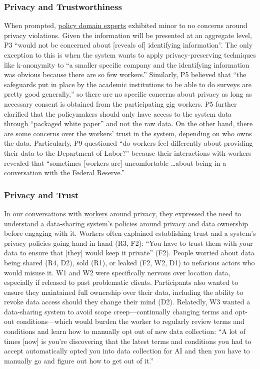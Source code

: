 \subsubsection{Privacy and Trustworthiness}\label{h.63yxjp6nz5ae}
{When prompted, \uline{policy domain experts} exhibited minor to no concerns around privacy violations.}
Given the information will be presented at an aggregate level, P3 ``would not be concerned about [reveals of] identifying information''. The only exception to this is when the system wants to apply privacy-preserving techniques like k-anonymity to ``a smaller specific company and the identifying information was obvious because there are so few workers.'' Similarly, P5 believed that ``the safeguards put in place by the academic institutions to be able to do surveys are pretty good generally,'' so there are no specific concerns about privacy as long as necessary consent {is obtained} from the participating gig workers. P5 further clarified that the policymakers should only have access to the system data through ``packaged white paper'' and not the raw data. On the other hand, there are some concerns over the workers' trust in the system, depending on who owns the data. Particularly, P9 questioned ``do workers feel differently about providing their data to the Department of Labor?'' because their interactions with workers revealed that ``sometimes [workers are] uncomfortable \dots about being in a conversation with the Federal Reserve.'' 



\subsubsection{Privacy and Trust}\label{findings-privacy}
{In our conversations with \uline{workers} around privacy, they expressed} the need to
understand a data-sharing system's policies around privacy and data ownership before engaging with it. {Workers} often explained establishing trust and a system's privacy policies going hand in hand (R3, F2): ``You have to trust them with your data to ensure that [they] would keep it private'' (F2). People worried about data being shared (R4, D2), sold (R1), or leaked (F2, W2, D1) to nefarious actors who would misuse it. W1 and W2 were specifically nervous over location data, especially if released to past problematic clients. Participants also wanted to ensure they maintained full ownership over their data, including the ability to revoke data access should they change their mind (D2). Relatedly, W3 wanted a data-sharing system to avoid scope creep---continually changing terms and opt-out conditions---which would burden the worker to regularly review terms and conditions and learn how to manually opt out of new data collection: ``A lot of times [now] is you're discovering that the latest terms and conditions you had to accept automatically opted you into data collection for AI and then you have to manually go and figure out how to get out of it.''

